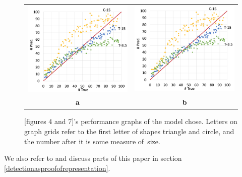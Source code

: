 \begin{figure}[th]
    \begin{center}
        \begin{tabular}{c c}
            \includegraphics[width = 3in]{Counting/LaTeX/figures/nopropersubitization.png} & \includegraphics[width = 3in]{Counting/LaTeX/figures/successpartial.png} \\
            \textbf{a}                                                                     & \textbf{b}
        \end{tabular}
        \caption{\cite{guan2021understanding}[figures 4 and 7]'s performance graphs of the model
                 \cite{guan2021understanding} chose. Letters on graph grids refer to the first
                 letter of shapes triangle and circle, and the number after it is some measure of\
                 size.}
    \end{center}
    \label{nogeneralizationofshapes}
\end{figure}

We also refer to and discuss parts of this paper in section \ref{detectionasproofofrepresentation}.
